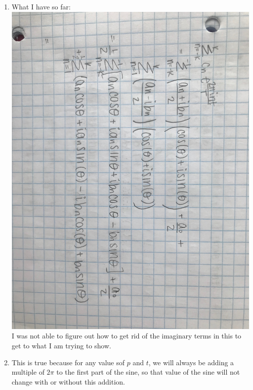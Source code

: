 \documentclass{article}
\begin{document}
\begin{enumerate}
\item What I have so far:\\
\includegraphics[scale=0.1]{exercise7}\\
I was not able to figure out how to get rid of the imaginary terms in this to get to what I am trying to show.

\item This is true because for any value sof $p$ and $t$, we will always be adding a multiple of $2\pi$ to the first part of the sine, so that value of the sine will not change with or without this addition. 


\end{enumerate}
\end{document}
